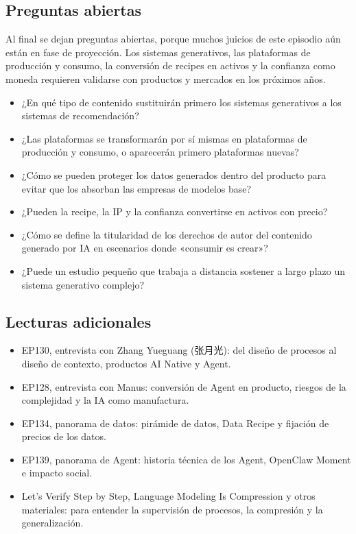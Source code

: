 \subsection{Preguntas abiertas}

Al final se dejan preguntas abiertas, porque muchos juicios de este episodio aún están en fase de proyección. Los sistemas generativos, las plataformas de producción y consumo, la conversión de recipes en activos y la confianza como moneda requieren validarse con productos y mercados en los próximos años.

\begin{itemize}
\item ¿En qué tipo de contenido sustituirán primero los sistemas generativos a los sistemas de recomendación?
\item ¿Las plataformas se transformarán por sí mismas en plataformas de producción y consumo, o aparecerán primero plataformas nuevas?
\item ¿Cómo se pueden proteger los datos generados dentro del producto para evitar que los absorban las empresas de modelos base?
\item ¿Pueden la recipe, la IP y la confianza convertirse en activos con precio?
\item ¿Cómo se define la titularidad de los derechos de autor del contenido generado por IA en escenarios donde «consumir es crear»?
\item ¿Puede un estudio pequeño que trabaja a distancia sostener a largo plazo un sistema generativo complejo?
\end{itemize}

\subsection{Lecturas adicionales}

\begin{itemize}
\item EP130, entrevista con Zhang Yueguang (张月光): del diseño de procesos al diseño de contexto, productos AI Native y Agent.
\item EP128, entrevista con Manus: conversión de Agent en producto, riesgos de la complejidad y la IA como manufactura.
\item EP134, panorama de datos: pirámide de datos, Data Recipe y fijación de precios de los datos.
\item EP139, panorama de Agent: historia técnica de los Agent, OpenClaw Moment e impacto social.
\item Let's Verify Step by Step, Language Modeling Is Compression y otros materiales: para entender la supervisión de procesos, la compresión y la generalización.
\end{itemize}

